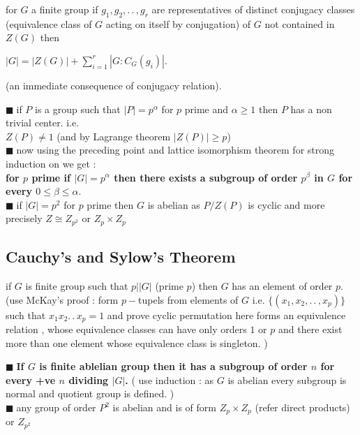 \documentclass[11pt]{extarticle}
\newcommand{\ck}{.\,.\,}
\newcommand{\sm}[2]{\displaystyle\sum_{#1}^{#2}}
\newcommand{\snote}[1]{{\footnotesize(#1)}}
\newcommand{\y}{$\blacksquare\;$}
\newcommand{\tbx}[2][]{
	\begin{tcolorbox}[enhanced,breakable,size=small,colback=black!2!white,title={#1},arc is angular, arc=1.5mm,drop fuzzy shadow]
		#2
	\end{tcolorbox}
}
\begin{document}
\begin{multicols}{2}
	\tbx[\textbf{The Class Equation} ]{for $ G $ a finite group if $ g_1,g_2,\ck , g_r $ are representatives of distinct conjugacy classes \snote{equivalence class of $ G $ acting on itself by conjugation} of $ G $ not contained in 
		$ Z(G) $ then 
		\begin{center}
			$  |G|=|Z(G)|+\sm{i=1}{r}|G:C_G(g_i)|.$
		\end{center} (an immediate consequence of conjugacy relation).
	}
	\tbx[Consequences of  Class equations :]{
		
			\y  if $ P $ is a group such that $ |P|=p^\alpha $ for $ p $ prime and $ \alpha \geq 1 $  then $ P $ has  
			a non trivial center. i.e. \\
			$ Z(P)\neq 1 $ (and by Lagrange theorem $ |Z(P) |\geq p $)\\
			\y  	now using the preceding point and lattice isomorphism theorem for strong induction on we get : \\ 
			\textbf{for $ p $ prime if $ |G|=p^\alpha $ then there exists a subgroup of order $ p^\beta $ in $ G $ for every
				$ 0\leq \beta \leq \alpha .$}\\
			\y  if $ |G|=p^2 $ for $ p $ prime then $ G $ is abelian as $ P/Z(P) $ is cyclic and more precisely  
			$ Z\cong Z_{p^2} $ or $ Z_p \times Z_p $
		
		
	}
	\subsection{Cauchy's and Sylow's Theorem}
	\tbx[\textbf{Cauchy's Theorem} ]{if $ G $ is finite group such that $ p| |G| $ (prime $ p $) then $ G $ has an element of order $ p .$\\
		{ \footnotesize (use McKay's proof  : form $ p- $tupels from elements of  $ G $ i.e. $ \{(x_1,x_2,\ck,x_p) \}$ such that $ x_1x_2\ck x_p =1 $  and prove cyclic permutation here forms an equivalence relation , whose equivalence classes can have only orders $ 1 $ or $ p $ and there exist more than one element whose equivalence class is singleton. )} 
	}
	\tbx[Consequences of Cauchy's  theorem ]{
		
			\y  \textbf{If $ G $ is finite ablelian group then it has a subgroup of order $ n $ for every +ve $ n $ dividing $ |G| $.} \snote{ use induction : as $ G $ is abelian every subgroup is normal and quotient group is defined. } \\
			\y  any group of order $ P^2 $ is abelian and is of form $ Z_p \times Z_p $ \snote{refer direct products} or $ Z_{p^2} $ 
		
}
\end{multicols}
\end{document}
